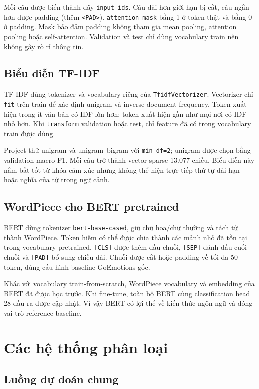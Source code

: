 \documentclass[12pt,a4paper]{article}
\begin{document}
Mỗi câu được biến thành dãy \texttt{input\_ids}. Câu dài hơn giới hạn bị cắt, câu ngắn hơn được padding (thêm \texttt{<PAD>}). \texttt{attention\_mask} bằng 1 ở token thật và bằng 0 ở padding. Mask bảo đảm padding không tham gia mean pooling, attention pooling hoặc self-attention. Validation và test chỉ dùng vocabulary train nên không gây rò rỉ thông tin.

\subsection{Biểu diễn TF-IDF}

TF-IDF dùng tokenizer và vocabulary riêng của \texttt{TfidfVectorizer}. Vectorizer chỉ \texttt{fit} trên train để xác định unigram và inverse document frequency. Token xuất hiện trong ít văn bản có IDF lớn hơn; token xuất hiện gần như mọi nơi có IDF nhỏ hơn. Khi \texttt{transform} validation hoặc test, chỉ feature đã có trong vocabulary train được dùng.

Project thử unigram và unigram--bigram với \texttt{min\_df=2}; unigram được chọn bằng validation macro-F1. Mỗi câu trở thành vector sparse 13.077 chiều. Biểu diễn này nắm bắt tốt từ khóa cảm xúc nhưng không thể hiện trực tiếp thứ tự dài hạn hoặc nghĩa của từ trong ngữ cảnh.

\subsection{WordPiece cho BERT pretrained}

BERT dùng tokenizer \texttt{bert-base-cased}, giữ chữ hoa/chữ thường và tách từ thành WordPiece. Token hiếm có thể được chia thành các mảnh nhỏ đã tồn tại trong vocabulary pretrained. \texttt{[CLS]} được thêm đầu chuỗi, \texttt{[SEP]} đánh dấu cuối chuỗi và \texttt{[PAD]} bổ sung chiều dài. Chuỗi được cắt hoặc padding về tối đa 50 token, đúng cấu hình baseline GoEmotions gốc.

Khác với vocabulary train-from-scratch, WordPiece vocabulary và embedding của BERT đã được học trước. Khi fine-tune, toàn bộ BERT cùng classification head 28 đầu ra được cập nhật. Vì vậy BERT có lợi thế về kiến thức ngôn ngữ và đóng vai trò reference baseline.

\section{Các hệ thống phân loại}
\subsection{Luồng dự đoán chung}
\end{document}
